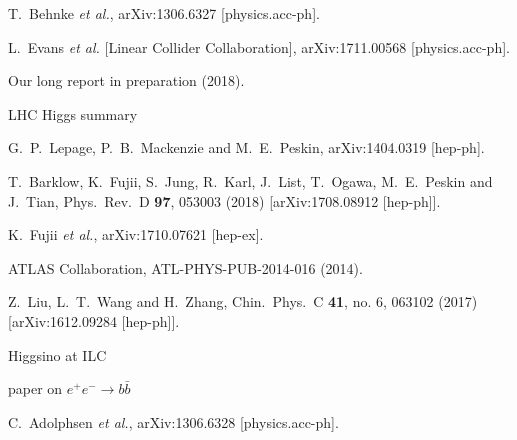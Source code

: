 \documentclass[%
 reprint,
 amsmath,amssymb,
 aps,
]{revtex4-1}
\def\ee{e^+e^-}
\begin{document}
\begin{thebibliography}{99}
  T.~Behnke {\it et al.},
  arXiv:1306.6327 [physics.acc-ph].


  L.~Evans {\it et al.} [Linear Collider Collaboration],
  arXiv:1711.00568 [physics.acc-ph].


Our long report in preparation  (2018). 


LHC Higgs summary

  G.~P.~Lepage, P.~B.~Mackenzie and M.~E.~Peskin,
  arXiv:1404.0319 [hep-ph].

  T.~Barklow, K.~Fujii, S.~Jung, R.~Karl, J.~List, T.~Ogawa, M.~E.~Peskin and J.~Tian,
  Phys.\ Rev.\ D {\bf 97},  053003 (2018)
  [arXiv:1708.08912 [hep-ph]].
 
  K.~Fujii {\it et al.},
  arXiv:1710.07621 [hep-ex].


ATLAS Collaboration, ATL-PHYS-PUB-2014-016 (2014).

 Z.~Liu, L.~T.~Wang and H.~Zhang,
  Chin.\ Phys.\ C {\bf 41}, no. 6, 063102 (2017)
  [arXiv:1612.09284 [hep-ph]].



Higgsino at ILC


paper on $\ee\to b\bar b$



  C.~Adolphsen {\it et al.},
  arXiv:1306.6328 [physics.acc-ph].



\end{thebibliography}
\end{document}
